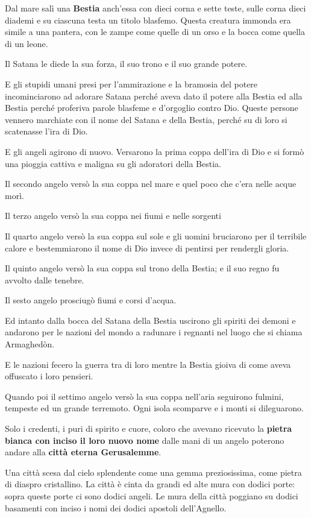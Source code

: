 \documentclass[12pt,a4paper,twoside,openany]{book}
\begin{document}
Dal mare salì una \textbf{Bestia} anch'essa con dieci corna e sette teste, sulle corna dieci diademi e su ciascuna testa un titolo blasfemo. Questa creatura immonda era simile a una pantera, con le zampe come quelle di un orso e la bocca come quella di un leone. 

Il Satana le diede la sua forza, il suo trono e il suo grande potere. 

E gli stupidi umani presi per l'ammirazione e la bramosia del potere incominciarono ad adorare Satana perché aveva dato il potere alla Bestia ed alla Bestia perché proferiva parole blasfeme e d'orgoglio contro Dio.
Queste persone vennero marchiate con il nome del Satana e della Bestia, perché su di loro si scatenasse l'ira di Dio.

E gli angeli agirono di nuovo. Versarono la prima coppa dell'ira di Dio e si formò una pioggia cattiva e maligna su gli adoratori della Bestia.

Il secondo angelo versò la sua coppa nel mare e quel poco che c'era nelle acque morì.

Il terzo angelo versò la sua coppa nei fiumi e nelle sorgenti 

Il quarto angelo versò la sua coppa sul sole e gli uomini bruciarono per il terribile calore e bestemmiarono il nome di Dio invece di pentirsi per rendergli gloria.

Il quinto angelo versò la sua coppa sul trono della Bestia; e il suo regno fu avvolto dalle tenebre. 

Il sesto angelo prosciugò fiumi e corsi d'acqua.

Ed intanto dalla bocca del Satana della Bestia uscirono gli spiriti dei demoni e andarono per le nazioni del mondo a radunare i regnanti nel luogo che si chiama Armaghedòn.

E le nazioni fecero la guerra tra di loro mentre la Bestia gioiva di come aveva offuscato i loro pensieri.

Quando poi il settimo angelo versò la sua coppa nell’aria  seguirono fulmini, tempeste ed un grande terremoto.
Ogni isola scomparve e i monti si dileguarono.

Solo i credenti, i puri di spirito e cuore, coloro che avevano ricevuto la \textbf{pietra bianca con inciso il loro nuovo nome} dalle mani di un angelo poterono andare alla \textbf{città eterna Gerusalemme}.

Una città scesa dal cielo splendente come una gemma preziosissima, come pietra di diaspro cristallino.  
La città è cinta da grandi ed alte mura con dodici porte: sopra queste porte ci sono dodici angeli.
Le mura della città poggiano su dodici basamenti con inciso i nomi dei dodici apostoli dell’Agnello.
\end{document}

